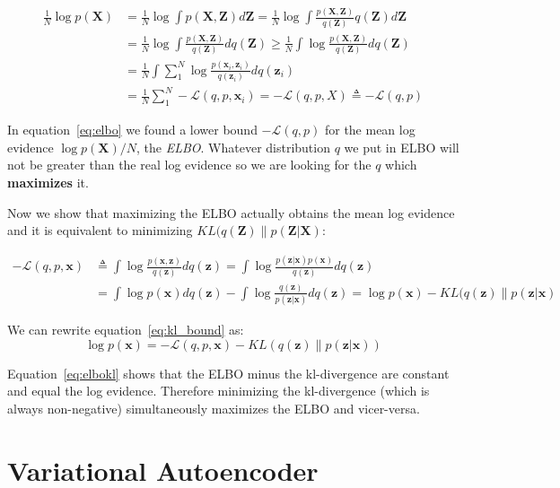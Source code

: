\documentclass[11pt, a4paper]{report}
\theoremstyle{plain}
\theoremstyle{definition}
\theoremstyle{remark}
\newcommand{\x}{\mathbf{x}}
\newcommand{\z}{\mathbf{z}}
\newcommand{\LL}{\mathcal{L}}
\newcommand{\bv}[1]{\boldsymbol{#1}}
\begin{document}
\begin{equation}
\label{eq:elbo}
\begin{aligned}
\frac{1}{N} \log p(\bv{X}) &= \frac{1}{N} \log \int p(\bv{X},\bv{Z}) d\bv{Z} 
= \frac{1}{N} \log \int \frac{p(\bv{X},\bv{Z})}{q(\bv{Z})} q(\bv{Z})d\bv{Z} \\
&=  \frac{1}{N} \log \int \frac{p(\bv{X},\bv{Z})}{q(\bv{Z})}dq(\bv{Z}) 
\geq  \frac{1}{N} \int \log \frac{p(\bv{X},\bv{Z})}{q(\bv{Z})}dq(\bv{Z}) \\
&= \frac{1}{N} \int \sum_1^N \log \frac{p(\x_i, \z_i)}{q(\z_i)}dq(\z_i) \\
&= \frac{1}{N} \sum_1^N - \LL(q,p,\x_i)
= -\mathcal{L}(q,p,X) \triangleq -\mathcal{L}(q,p)
\end{aligned}
\end{equation}

In equation~\ref{eq:elbo} we found a lower bound $-\mathcal{L}(q,p)$ for the
mean log
evidence $\log p(\bv{X})/N$, the \emph{ELBO}.
Whatever distribution $q$ we put in ELBO will not be
greater than the real log evidence so we are looking for the $q$ which
\textbf{maximizes} it.

Now we show that maximizing the ELBO actually obtains the mean log evidence and it is
equivalent to minimizing $KL(q(\bv{Z}) \| p(\bv{Z}|\bv{X})$:

\begin{equation}\label{eq:kl_bound}
\begin{aligned}
-\mathcal{L}(q,p,\x) &\triangleq \int \log \frac{p(\bv{x},\bv{z})}{q(\bv{z})} d
q(\bv{z})
= \int \log \frac{p(\bv{z}|\bv{x})p(\bv{x})}{q(\bv{z})} d q(\bv{z}) \\
&= \int \log p(\bv{x}) dq(\bv{z}) - \int \log \frac{q(\bv{z})}{p(\bv{z}|\bv{x})}
dq(\bv{z}) 
= \log p(\bv{x}) - KL(q(\bv{z}) \| p(\bv{z}|\bv{x})
\end{aligned}
\end{equation}

We can rewrite equation~\ref{eq:kl_bound} as:
\begin{equation}\label{eq:elbokl}
\log p(\bv{x}) = -\mathcal{L}(q,p,\x) - KL(q(\bv{z}) \| p(\bv{z}|\bv{x}))
\end{equation}

Equation~\ref{eq:elbokl} shows that the ELBO minus the kl-divergence are constant
and equal the log evidence. Therefore minimizing the kl-divergence (which is
always non-negative) simultaneously maximizes the ELBO and vicer-versa.

\section{Variational Autoencoder}
\end{document}
